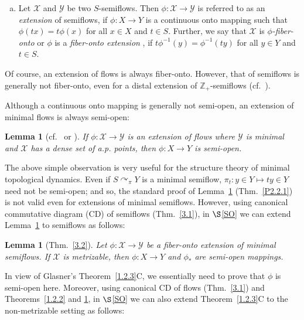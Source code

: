 \documentclass[12pt,final,3p,times]{elsarticle}
\newtheorem{slem}[sthm]{Lemma}
\theoremstyle{definition}
\numberwithin{equation}{section}
\begin{document}
\begin{enumerate}[a.]
    \item[\textbf{e.}] Let $\mathscr{X}$ and $\mathscr{Y}$ be two $S$-semiflows. Then $\phi\colon\mathscr{X}\rightarrow \mathscr{Y}$ is referred to as an \textit{extension} of semiflows, if $\phi\colon X\rightarrow Y$ is a continuous onto mapping such that $\phi(tx)=t\phi(x)$ for all $x\in X$ and $t\in S$. Further, we say that $\mathscr{X}$ is 
\textit{$\phi$-fiber-onto} or $\phi$ is a \textit{fiber-onto extension} \cite[Def.~1.1.2c]{CD}, if $t\phi^{-1}(y)=\phi^{-1}(ty)$ for all $y\in Y$ and $t\in S$.
\end{enumerate}
Of course, an extension of flows is always fiber-onto. However, that of semiflows is generally not fiber-onto, even for a distal extension of $\mathbb{Z}_+$-semiflows (cf.~\cite[Ex.~1.1.3a]{CD}). 
 
Although a continuous onto mapping is generally not semi-open, an extension of minimal flows is always semi-open:

\begin{slem}[{cf.~\cite[Lem.~3.12.15]{B79} or \cite{V70, Wo, A88}}]\label{1.3.2}
If $\phi\colon \mathscr{X}\rightarrow \mathscr{Y}$ is an extension of flows where $\mathscr{Y}$ is minimal and $\mathscr{X}$ has a dense set of a.p. points, then $\phi\colon X\rightarrow Y$ is semi-open.
\end{slem}

The above simple observation is very useful for the structure theory of minimal topological dynamics. Even if $S\curvearrowright_\pi Y$ is a minimal semiflow, $\pi_t\colon y\in Y\mapsto ty\in Y$ need not be semi-open; and so, the standard proof of Lemma~\ref{1.3.2} (Thm.~\ref{P2.2.1}) is not valid even for extensions of minimal semiflows. However, using canonical commutative diagram (CD) of semiflows (Thm.~\ref{3.1}), in $\S$\ref{SO} we can extend Lemma~\ref{1.3.2} to semiflows as follows:

\begin{slem}[Thm.~\ref{3.2}]\label{1.3.3}
Let $\phi\colon \mathscr{X}\rightarrow \mathscr{Y}$ be a fiber-onto  extension of minimal semiflows. If $\mathscr{X}$ is metrizable, then $\phi\colon X\rightarrow Y$ and $\phi_*$ are semi-open mappings.
\end{slem}

In view of Glasner's Theorem~\ref{1.2.3}C, we essentially need to prove that $\phi$ is semi-open here.
Moreover, using canonical CD of flows (Thm.~\ref{3.1}) and Theorems~\ref{1.2.2} and \ref{1.3.2}, in $\S$\ref{SO} we can also extend Theorem~\ref{1.2.3}C to the non-metrizable setting as follows:
\end{document}
